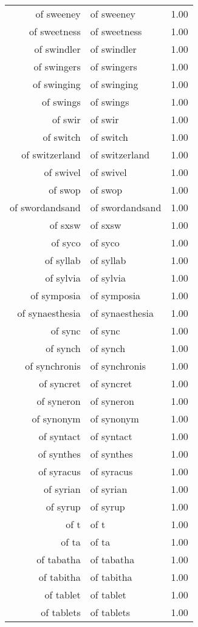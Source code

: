 \begin{table}[ht]
\begin{tabular}{rlr}
  of sweeney & of sweeney & 1.00 \\ 
  of sweetness & of sweetness & 1.00 \\ 
  of swindler & of swindler & 1.00 \\ 
  of swingers & of swingers & 1.00 \\ 
  of swinging & of swinging & 1.00 \\ 
  of swings & of swings & 1.00 \\ 
  of swir & of swir & 1.00 \\ 
  of switch & of switch & 1.00 \\ 
  of switzerland & of switzerland & 1.00 \\ 
  of swivel & of swivel & 1.00 \\ 
  of swop & of swop & 1.00 \\ 
  of swordandsand & of swordandsand & 1.00 \\ 
  of sxsw & of sxsw & 1.00 \\ 
  of syco & of syco & 1.00 \\ 
  of syllab & of syllab & 1.00 \\ 
  of sylvia & of sylvia & 1.00 \\ 
  of symposia & of symposia & 1.00 \\ 
  of synaesthesia & of synaesthesia & 1.00 \\ 
  of sync & of sync & 1.00 \\ 
  of synch & of synch & 1.00 \\ 
  of synchronis & of synchronis & 1.00 \\ 
  of syncret & of syncret & 1.00 \\ 
  of syneron & of syneron & 1.00 \\ 
  of synonym & of synonym & 1.00 \\ 
  of syntact & of syntact & 1.00 \\ 
  of synthes & of synthes & 1.00 \\ 
  of syracus & of syracus & 1.00 \\ 
  of syrian & of syrian & 1.00 \\ 
  of syrup & of syrup & 1.00 \\ 
  of t & of t & 1.00 \\ 
  of ta & of ta & 1.00 \\ 
  of tabatha & of tabatha & 1.00 \\ 
  of tabitha & of tabitha & 1.00 \\ 
  of tablet & of tablet & 1.00 \\ 
  of tablets & of tablets & 1.00 \\ 

\end{tabular}
\end{table}
